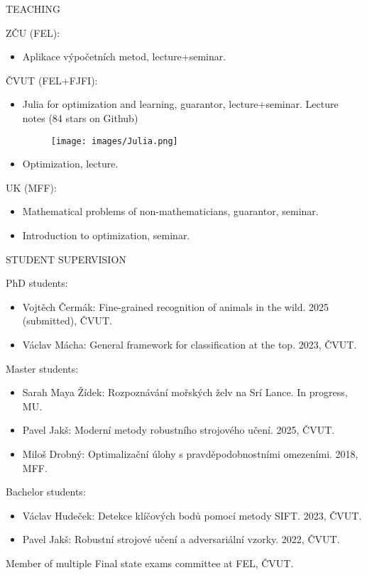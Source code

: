 \documentclass[11pt, aspectratio=169]{beamer}
\newenvironment{wideitemize}{\itemize\addtolength{\itemsep}{10pt}}{\enditemize}
\begin{document}
\begin{frame}{TEACHING}
\begin{wideitemize}
\item ZČU (FEL):
\begin{itemize}
\item Aplikace výpočetních metod, lecture+seminar.
\end{itemize}
\pause \item ČVUT (FEL+FJFI):
\begin{itemize}
\item Julia for optimization and learning, guarantor, lecture+seminar. Lecture notes (84 stars on Github)
\begin{figure}
\texttt{[image: images/Julia.png]}
\end{figure}
\item Optimization, lecture.
\end{itemize}
\pause \item UK (MFF):
\begin{itemize}
\item Mathematical problems of non-mathematicians, guarantor, seminar.
\item Introduction to optimization, seminar.
\end{itemize}
\end{wideitemize}
\end{frame}


\begin{frame}{STUDENT SUPERVISION}
\begin{wideitemize}
\item PhD students:
\begin{itemize}
\item Vojtěch Čermák: Fine-grained recognition of animals in the wild. 2025 (submitted), ČVUT. 
\item Václav Mácha: General framework for classification at the top. 2023, ČVUT.
\end{itemize}
\pause \item Master students:
\begin{itemize}
\item Sarah Maya Žídek: Rozpoznávání mořských želv na Srí Lance. In progress, MU. 
\item Pavel Jakš: Moderní metody robustního strojového učení. 2025, ČVUT.
\item Miloš Drobný: Optimalizační úlohy s pravděpodobnostními omezeními. 2018, MFF.
\end{itemize}
\pause \item Bachelor students:
\begin{itemize}
\item Václav Hudeček: Detekce klíčových bodů pomocí metody SIFT. 2023, ČVUT.
\item Pavel Jakš: Robustní strojové učení a adversariální vzorky. 2022, ČVUT.
\end{itemize}
\pause \item Member of multiple Final state exams committee at FEL, ČVUT.
\end{wideitemize}
\end{frame}
\end{document}
